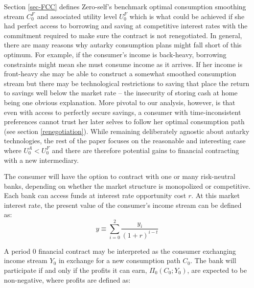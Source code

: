 \documentclass[11pt,english]{article}
\theoremstyle{plain}
\theoremstyle{definition}
\begin{document}
Section
\ref{sec-FCC} defines Zero-self's benchmark optimal consumption
smoothing stream $C_{0}^{F}$ and associated utility level $U_{0}^{F}$
which is what could be achieved if she had perfect access to borrowing
and saving at competitive interest rates with the commitment required
to make sure the contract is not renegotiated. In general, there are
many reasons why  autarky consumption plans might fall short
of this optimum. For example, if the
consumer's income is back-heavy, borrowing constraints might mean
she must consume  income as it arrives. If her income is front-heavy
she may be able to construct a somewhat smoothed consumption
stream but there may be technological restrictions to saving that
place the return to savings well below the market rate -- the insecurity
of storing cash at home being one obvious explanation. More pivotal
to our analysis, however, is that even with access to perfectly
secure savings, a consumer with time-inconsistent preferences cannot
trust her later selves to follow her optimal consumption path (see section \ref{renegotiation}). 
While remaining deliberately agnostic about autarky technologies,
the rest of the paper focuses on the reasonable and interesting case
where $U_{0}^{A}<U_{0}^{F}$ and there are therefore potential gains
to financial contracting with a new intermediary.

The consumer will have the option to contract with one or many risk-neutral
banks, depending on whether the market structure is monopolized or
competitive. Each bank can access funds at interest rate opportunity cost $r$. At this
market interest rate, the present value of the consumer's income stream
can be defined as:
\begin{equation}
y\equiv\sum\limits _{i=0}^{2}\frac{y_{i}}{\left(1+r\right)^{i-t}}
\end{equation}

A period 0 financial  contract may be interpreted as the consumer exchanging income stream $Y_{0}$ in exchange for a new consumption path $C_{0}$. The bank will participate if and only if the profits it can earn, $\Pi_{0}(C_{0};Y_{0})$, are
expected to be non-negative, where profits are defined as:
\end{document}
